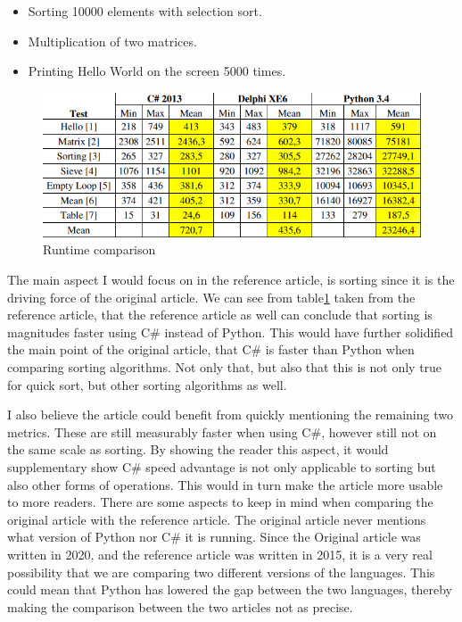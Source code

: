 \documentclass{article}
\begin{document}
\begin{itemize}
 \item Sorting 10000 elements with selection sort.
 \item Multiplication of two matrices.
 \item Printing Hello World on the screen 5000 times. 
\end{itemize}
\begin{figure}
 \caption{Runtime comparison}
 \label{fig:runtimeTable}
 \includegraphics[width=\textwidth]{runtimeTable.png}
\end{figure}
The main aspect I would focus on in the reference article, is sorting since it is the driving force of the original article. We can see from table\ref{fig:runtimeTable} taken from the reference article, that the reference article as well can conclude that sorting is magnitudes faster using C\# instead of Python. This would have further solidified the main point of the original article, that C\# is faster than Python when comparing sorting algorithms. Not only that, but also that this is not only true for quick sort, but other sorting algorithms as well.
 
I also believe the article could benefit from quickly mentioning the remaining two metrics. These are still measurably faster when using C\#, however still not on the same scale as sorting. By showing the reader this aspect, it would supplementary show C\# speed advantage is not only applicable to sorting but also other forms of operations. This would in turn make the article more usable to more readers.
There are some aspects to keep in mind when comparing the original article with the reference article. The original article never mentions what version of Python nor C\# it is running. Since the Original article was written in 2020, and the reference article was written in 2015, it is a very real possibility that we are comparing two different versions of the languages. This could mean that Python has lowered the gap between the two languages, thereby making the comparison between the two articles not as precise.
 
\end{document}
